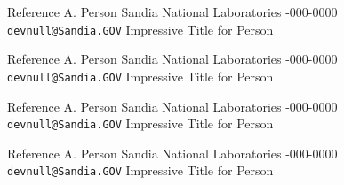 \documentclass[margin,line,11pt,final]{res}
\begin{document}
\begin{resume}
{%
Reference A. Person \newline
Sandia National Laboratories -000-0000 \newline
{\tt devnull@Sandia.GOV} \newline
Impressive Title for Person



%
Reference A. Person \newline
Sandia National Laboratories -000-0000 \newline
{\tt devnull@Sandia.GOV} \newline
Impressive Title for Person



%
Reference A. Person \newline
Sandia National Laboratories -000-0000 \newline
{\tt devnull@Sandia.GOV} \newline
Impressive Title for Person



%
Reference A. Person \newline
Sandia National Laboratories -000-0000 \newline
{\tt devnull@Sandia.GOV} \newline
Impressive Title for Person



}


\end{resume}
\end{document}
